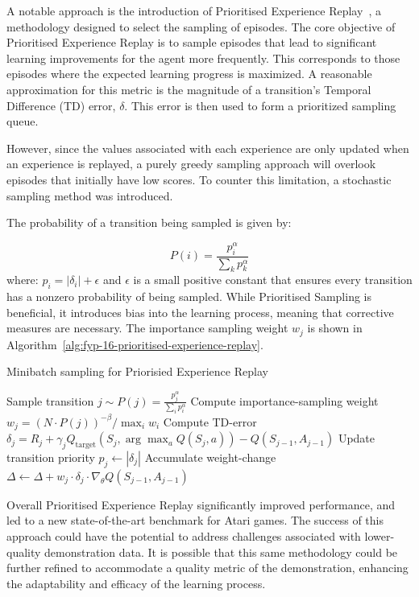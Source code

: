 A notable approach is the introduction of Prioritised Experience Replay~\cite{fyp-16-prioritised-experience-replay}, a methodology designed to select the sampling of episodes. 
The core objective of Prioritised Experience Replay is to sample episodes that lead to significant learning improvements for the agent more frequently. 
This corresponds to those episodes where the expected learning progress is maximized. 
A reasonable approximation for this metric is the magnitude of a transition's Temporal Difference (TD) error, $\delta$. 
This error is then used to form a prioritized sampling queue.

However, since the values associated with each experience are only updated when an experience is replayed, a purely greedy sampling approach will overlook episodes that initially have low scores.
To counter this limitation, a stochastic sampling method was introduced.

The probability of a transition being sampled is given by:

\[ P(i) = \frac{p_{i}^{\alpha}}{\sum_{k} p_{k}^{\alpha}} \]
where: $p_{i} = |\delta_{i}| + \epsilon$ and $\epsilon$ is a small positive constant that ensures every transition has a nonzero probability of being sampled.
While Prioritised Sampling is beneficial, it introduces bias into the learning process, meaning that corrective measures are necessary. 
The importance sampling weight $w_j$ is shown in Algorithm~\ref{alg:fyp-16-prioritised-experience-replay}.

\begin{algorithm}
  \caption{Minibatch sampling for Priorisied Experience Replay}
  \label{alg:fyp-16-prioritised-experience-replay}
  \begin{algorithmic}[1]
      \State Sample transition $j \sim P(j) = \frac{p^{\alpha}_j}{\sum_i p^{\alpha}_i}$
      \State Compute importance-sampling weight $w_j = \left( N \cdot P(j) \right)^{-\beta} / \max_i w_i$
      \State Compute TD-error $\delta_j = R_j + \gamma_j Q_{\text{target}} \left( S_j, \arg\max_a Q(S_j, a) \right) - Q(S_{j-1}, A_{j-1})$
      \State Update transition priority $p_j \leftarrow |\delta_j|$
      \State Accumulate weight-change $\Delta \leftarrow \Delta + w_j \cdot \delta_j \cdot \nabla_{\theta}Q(S_{j-1}, A_{j-1})$
  \EndFor
  \end{algorithmic}
  \end{algorithm}  
  

Overall Prioritised Experience Replay significantly improved performance, and led to a new state-of-the-art benchmark for Atari games.
The success of this approach could have the potential to address challenges associated with lower-quality demonstration data.
It is possible that this same methodology could be further refined to accommodate a quality metric of the demonstration, enhancing the adaptability and efficacy of the learning process. \\\\




